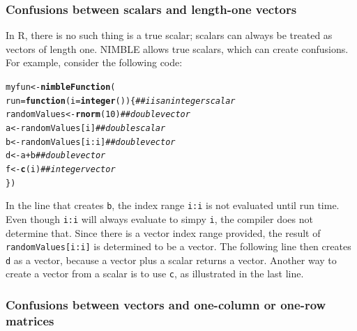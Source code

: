 \documentclass[12pt,oneside]{book}\usepackage[]{graphicx}\usepackage[]{color}
\makeatletter
\newcommand{\hlnum}[1]{\textcolor[rgb]{0.686,0.059,0.569}{#1}}%
\newcommand{\hlcom}[1]{\textcolor[rgb]{0.678,0.584,0.686}{\textit{#1}}}%
\newcommand{\hlopt}[1]{\textcolor[rgb]{0,0,0}{#1}}%
\newcommand{\hlstd}[1]{\textcolor[rgb]{0.345,0.345,0.345}{#1}}%
\newcommand{\hlkwa}[1]{\textcolor[rgb]{0.161,0.373,0.58}{\textbf{#1}}}%
\newcommand{\hlkwb}[1]{\textcolor[rgb]{0.69,0.353,0.396}{#1}}%
\newcommand{\hlkwc}[1]{\textcolor[rgb]{0.333,0.667,0.333}{#1}}%
\newcommand{\hlkwd}[1]{\textcolor[rgb]{0.737,0.353,0.396}{\textbf{#1}}}%
\newenvironment{kframe}{%
 \def\at@end@of@kframe{}%
 \ifinner\ifhmode%
  \def\at@end@of@kframe{\end{minipage}}%
  \begin{minipage}{\columnwidth}%
 \fi\fi%
 \def\FrameCommand##1{\hskip\@totalleftmargin \hskip-\fboxsep
 \colorbox{shadecolor}{##1}\hskip-\fboxsep
     \hskip-\linewidth \hskip-\@totalleftmargin \hskip\columnwidth}%
 \MakeFramed {\advance\hsize-\width
   \@totalleftmargin\z@ \linewidth\hsize
   \@setminipage}}%
 {\par\unskip\endMakeFramed%
 \at@end@of@kframe}
\newenvironment{knitrout}{}{} %
\def\cd#1{\texttt{#1}}
\makeatother
\begin{document}
\subsubsection{Confusions between scalars and length-one vectors}
\label{sec:conf-betw-scal}

In R, there is no such thing is a true scalar; scalars can always be
treated as vectors of length one.  NIMBLE allows true scalars, which
can create confusions.  For example, consider the following code:

\begin{knitrout}
\color{fgcolor}\begin{kframe}
\begin{alltt}
\hlstd{myfun} \hlkwb{<-} \hlkwd{nimbleFunction}\hlstd{(}
    \hlkwc{run} \hlstd{=} \hlkwa{function}\hlstd{(}\hlkwc{i} \hlstd{=} \hlkwd{integer}\hlstd{()) \{} \hlcom{## i is an integer scalar}
        \hlstd{randomValues} \hlkwb{<-} \hlkwd{rnorm}\hlstd{(}\hlnum{10}\hlstd{)}   \hlcom{## double vector}
        \hlstd{a} \hlkwb{<-} \hlstd{randomValues[i]}        \hlcom{## double scalar}
        \hlstd{b} \hlkwb{<-} \hlstd{randomValues[i}\hlopt{:}\hlstd{i]}      \hlcom{## double vector}
        \hlstd{d} \hlkwb{<-} \hlstd{a} \hlopt{+} \hlstd{b}                  \hlcom{## double vector}
        \hlstd{f} \hlkwb{<-} \hlkwd{c}\hlstd{(i)}                   \hlcom{## integer vector}
    \hlstd{\})}
\end{alltt}
\end{kframe}
\end{knitrout}

In the line that creates \cd{b}, the index range \cd{i:i} is not
evaluated until run time.  Even though \cd{i:i} will always evaluate
to simpy \cd{i}, the compiler does not determine that.  Since there is
a vector index range provided, the result of \cd{randomValues[i:i]} is
determined to be a vector.  The following line then creates \cd{d} as
a vector, because a vector plus a scalar returns a vector.  Another
way to create a vector from a scalar is to use \cd{c}, as
illustrated in the last line.

\subsubsection{Confusions between vectors and one-column or one-row matrices}
\label{sec:conf-betw-scal}
\end{document}
